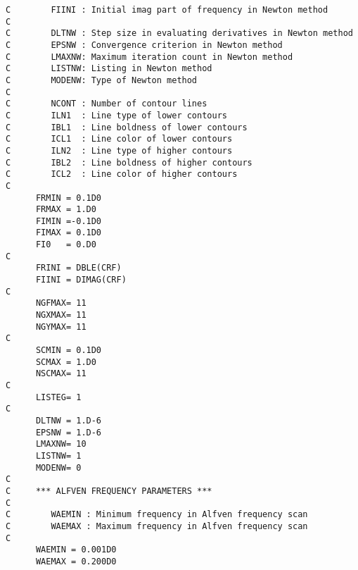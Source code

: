 \documentclass[11pt]{jarticle}
\begin{document}
\begin{verbatim}
C        FIINI : Initial imag part of frequency in Newton method
C
C        DLTNW : Step size in evaluating derivatives in Newton method
C        EPSNW : Convergence criterion in Newton method
C        LMAXNW: Maximum iteration count in Newton method
C        LISTNW: Listing in Newton method
C        MODENW: Type of Newton method
C
C        NCONT : Number of contour lines
C        ILN1  : Line type of lower contours
C        IBL1  : Line boldness of lower contours
C        ICL1  : Line color of lower contours
C        ILN2  : Line type of higher contours
C        IBL2  : Line boldness of higher contours
C        ICL2  : Line color of higher contours
C
      FRMIN = 0.1D0
      FRMAX = 1.D0
      FIMIN =-0.1D0
      FIMAX = 0.1D0
      FI0   = 0.D0
C
      FRINI = DBLE(CRF)
      FIINI = DIMAG(CRF)
C
      NGFMAX= 11
      NGXMAX= 11
      NGYMAX= 11
C
      SCMIN = 0.1D0
      SCMAX = 1.D0
      NSCMAX= 11
C
      LISTEG= 1
C
      DLTNW = 1.D-6
      EPSNW = 1.D-6
      LMAXNW= 10
      LISTNW= 1
      MODENW= 0
C
C     *** ALFVEN FREQUENCY PARAMETERS ***
C
C        WAEMIN : Minimum frequency in Alfven frequency scan
C        WAEMAX : Maximum frequency in Alfven frequency scan
C
      WAEMIN = 0.001D0
      WAEMAX = 0.200D0
\end{verbatim}
\end{document}
